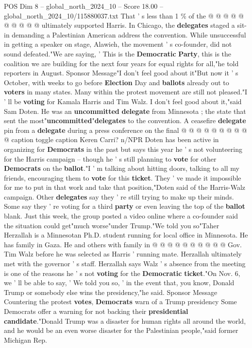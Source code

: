 \begin{textsample}{POS Dim 8 – global\_north\_2024\_10 – Score 18.00 – global\_north\_2024\_10/115880037.txt}
That ' s less than 1 \% of the @ @ @ @ @ @ @ @ @ @ ultimately supported Harris.
In Chicago, the \textbf{delegates} staged a sit-in demanding a Palestinian American address the convention.
While unsuccessful in getting a speaker on stage, Alawieh, the movement ' s co-founder, did not sound defeated."We are saying, ' This is the \textbf{Democratic} \textbf{Party}, this is the coalition we are building for the next four years for equal rights for all,"he told reporters in August.
Sponsor Message"I don't feel good about it"But now it ' s October, with weeks to go before \textbf{Election} Day and \textbf{ballots} already out to \textbf{voters} in many states.
Many within the protest movement are still not pleased."I ' ll be \textbf{voting} for Kamala Harris and Tim Walz.
I don't feel good about it,"said Sam Doten.
He was an \textbf{uncommitted} \textbf{delegate} from Minnesota ; the state that sent the most"\textbf{uncommitted}"\textbf{delegates} to the convention.
A ceasefire \textbf{delegate} pin from a \textbf{delegate} during a press conference on the final @ @ @ @ @ @ @ @ @ @ caption toggle caption Keren Carri? n/NPR Doten has been active in organizing for \textbf{Democrats} in the past but says this year he ' s not volunteering for the Harris campaign -- though he ' s still planning to \textbf{vote} for other \textbf{Democrats} on the \textbf{ballot}."I ' m talking about hitting doors, talking to all my friends, encouraging them to \textbf{vote} for this \textbf{ticket}.
They ' ve made it impossible for me to put in that work and take that position,"Doten said of the Harris-Walz campaign.
Other \textbf{delegates} say they ' re still trying to make up their minds.
Some say they ' re voting for a third \textbf{party} or even leaving the top of the \textbf{ballot} blank.
Just this week, the group posted a video online where a co-founder said the situation could get"much worse"under Trump."We told you so"Taher Herzallah is a Minnesotan Ph.D. student running for local office in Minnesota.
He has family in Gaza.
He and others with family in @ @ @ @ @ @ @ @ @ @ Gov.
Tim Walz before he was selected as Harris ' running mate.
Herzallah ultimately met with the governor ' s staff.
Herzallah says Walz ' s absence from the meeting is one of the reasons he ' s not \textbf{voting} for the \textbf{Democratic} \textbf{ticket}."On Nov. 6, we ' ll be able to say, ' We told you so, ' in the event that, you know, Donald Trump or somebody else wins the presidency,"he said.
Sponsor Message Countering the protest \textbf{votes}, \textbf{Democrats} warn of a Trump presidency Some Democrats offer a warning for not backing their \textbf{presidential} \textbf{candidate}."Donald Trump was a disaster for human rights all around the world, and he would be an even worse disaster for the Palestinian people,"said former Michigan Rep.

\end{textsample}

